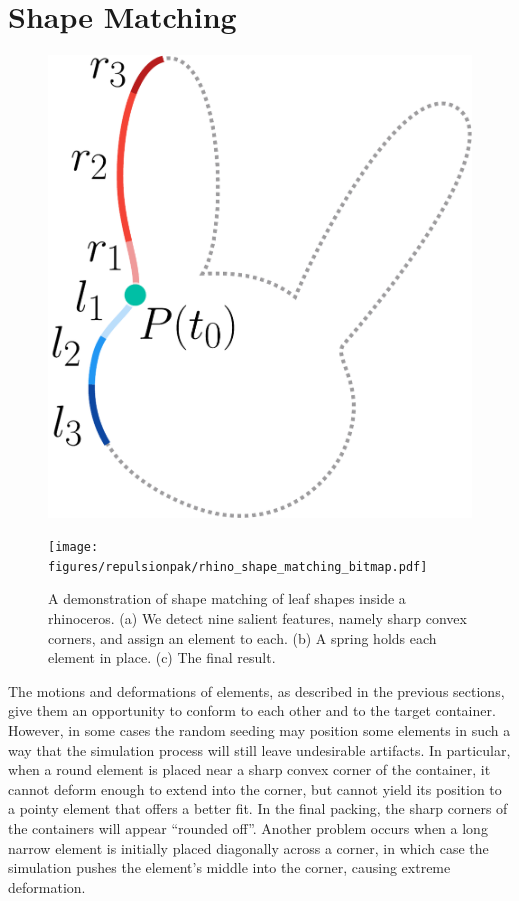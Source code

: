 \section{Shape Matching}
\label{repulsionpak_shape_matching}



\begin{figure}[t]
\centering
\includegraphics[width=0.3\columnwidth]{figures/repulsionpak/descriptor_2.pdf}
\caption[A local shape descriptor for shape matching]
{\label{fig_shape_matching}
}
\end{figure}
\begin{figure}
\centering
\texttt{[image: figures/repulsionpak/rhino\_shape\_matching\_bitmap.pdf]} 
\caption[A demonstration of shape matching of leaf shapes inside a rhinoceros]
{\label{rhino_packing}
{ 
A demonstration of shape matching of leaf shapes inside a rhinoceros. 
(a) We detect nine salient features, namely sharp convex corners, and 
assign an element to each.
(b) A spring holds each element in place.
(c) The final result.
}
}
\end{figure}

\newtext
{
The motions and deformations of elements, as described
in the previous sections, give them an opportunity to conform to each 
other and to the target container.  However, in some cases the random 
seeding may position some elements in such a way that the simulation 
process will still leave undesirable artifacts.  In particular, when
a round element is placed near a sharp convex corner of the container,
it cannot deform enough to extend into the corner, but cannot yield its
position to a pointy element that offers a better fit.  In the final
packing, the sharp corners of the containers will appear ``rounded off''.
Another problem occurs when a long narrow element is initially placed diagonally across a corner, 
in which case the simulation pushes the element's middle into the corner, causing extreme deformation.
}

